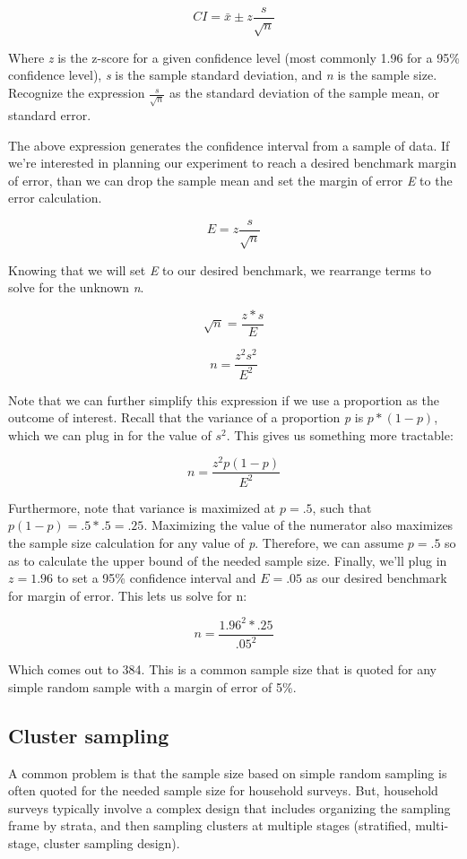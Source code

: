 \documentclass[
  letterpaper,
  DIV=11,
  numbers=noendperiod]{scrreprt}
\begin{document}
\[
CI=\bar{x}\pm z\frac{s}{\sqrt{n}}
\]

Where \emph{z} is the z-score for a given confidence level (most
commonly 1.96 for a 95\% confidence level), \emph{s} is the sample
standard deviation, and \emph{n} is the sample size. Recognize the
expression \(\frac{s}{\sqrt{n}}\) as the standard deviation of the
sample mean, or standard error.

The above expression generates the confidence interval from a sample of
data. If we're interested in planning our experiment to reach a desired
benchmark margin of error, than we can drop the sample mean and set the
margin of error \emph{E} to the error calculation.

\[
E=z\frac{s}{\sqrt{n}}
\]

Knowing that we will set \emph{E} to our desired benchmark, we rearrange
terms to solve for the unknown \emph{n}.

\[
\sqrt{n}=\frac{z*s}{E}
\]

\[
n=\frac{z^2s^2}{E^2}
\]

Note that we can further simplify this expression if we use a proportion
as the outcome of interest. Recall that the variance of a proportion
\emph{p} is \(p*(1-p)\), which we can plug in for the value of \(s^2\).
This gives us something more tractable:

\[
n=\frac{z^2p(1-p)}{E^2}
\]

Furthermore, note that variance is maximized at \(p=.5\), such that
\(p(1-p) = .5*.5=.25\). Maximizing the value of the numerator also
maximizes the sample size calculation for any value of \emph{p}.
Therefore, we can assume \(p=.5\) so as to calculate the upper bound of
the needed sample size. Finally, we'll plug in \(z=1.96\) to set a 95\%
confidence interval and \(E=.05\) as our desired benchmark for margin of
error. This lets us solve for n:

\[
n=\frac{1.96^2*.25}{.05^2}
\]

Which comes out to 384. This is a common sample size that is quoted for
any simple random sample with a margin of error of 5\%.

\subsection{Cluster sampling}\label{cluster-sampling-1}

A common problem is that the sample size based on simple random sampling
is often quoted for the needed sample size for household surveys. But,
household surveys typically involve a complex design that includes
organizing the sampling frame by strata, and then sampling clusters at
multiple stages (stratified, multi-stage, cluster sampling design).
\end{document}
